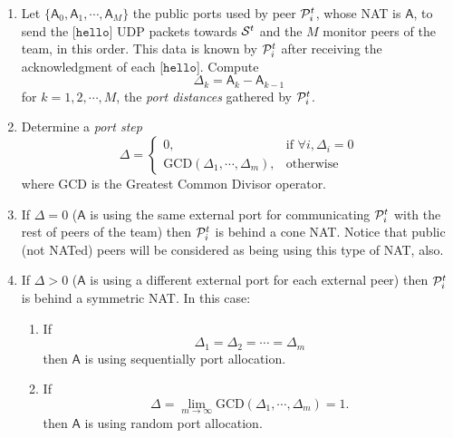 \begin{enumerate}
\item Let $\{\mathsf{A}_0, \mathsf{A}_1, \cdots, \mathsf{A}_M\}$ the
  public ports used by peer ${\cal P}^t_i$, whose NAT is $\mathsf{A}$,
  to send the [$\mathtt{hello}$] UDP packets towards ${\cal S}^t$ and
  the $M$ monitor peers of the team, in this order. This data is known
  by ${\cal P}^t_i$ after receiving the acknowledgment of each
  [$\mathtt{hello}$]. Compute
  \begin{equation}
    \Delta_k = \mathsf{A}_k - \mathsf{A}_{k-1}
    \label{eq:port_distancies}
  \end{equation}
  for $k=1,2,\cdots,M$, the \emph{port distances} gathered by ${\cal
    P}^t_i$.
\item Determine a \emph{port step}
  \begin{equation}
    \Delta = \left\{\begin{array}{lr}
    0, & \text{if } \forall i, \Delta_i = 0 \\
    \mathrm{GCD}(\Delta_1, \cdots, \Delta_m), & \text{otherwise}
    \end{array}\right.
    \label{eq:port_step}
  \end{equation}
  where GCD is the Greatest Common Divisor operator.
\item If $\Delta=0$ ($\mathsf{A}$ is using the same external port for
  communicating ${\cal P}^t_i$ with the rest of peers of the team)
  then ${\cal P}^t_i$ is behind a cone NAT. Notice that public (not
  NATed) peers will be considered as being using this type of NAT,
  also.
\item If $\Delta>0$ ($\mathsf{A}$ is using a different external port
  for each external peer) then ${\cal P}^t_i$ is behind a symmetric
  NAT. In this case:
  \begin{enumerate}
  \item If
    \begin{equation}
      \Delta_1 = \Delta_2 = \cdots = \Delta_m
    \end{equation}
    then $\mathsf{A}$ is using sequentially port allocation.
  \item If
    \begin{equation}
      \Delta = \lim_{m\to\infty} \mathrm{GCD}(\Delta_1, \cdots, \Delta_m) = 1.
    \end{equation}
    then $\mathsf{A}$ is using random port allocation.
  \end{enumerate}
\end{enumerate}


